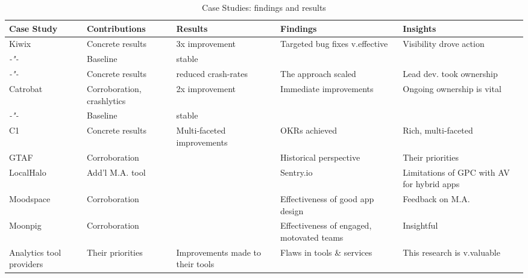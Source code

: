 \begin{landscape} %
\begin{table}
    \centering
    \tabcolsep=0.06cm
    \tiny
    \begin{tabular}{lllll}\toprule
    Case Study                  &Contributions    &Results               &Findings             &Insights  \\
    \midrule
    Kiwix                       &Concrete results &3x improvement        &Targeted bug fixes v.effective &Visibility drove action \\ 
     \textit{-"-}               &Baseline         &stable                &                     & \\
     \textit{-"-}               &Concrete results &reduced crash-rates   &The approach scaled  &Lead dev. took ownership \\
     \midrule
    Catrobat                    &Corroboration, crashlytics &2x improvement     &Immediate improvements &Ongoing ownership is vital \\
     \textit{-"-}               &Baseline         &stable                &                     & \\
     \midrule
    C1                          &Concrete results &Multi-faceted improvements &OKRs achieved & Rich, multi-faceted \\
    GTAF                        &Corroboration    &                      &Historical perspective &Their priorities  \\
    LocalHalo                   &Add'l M.A. tool  &                      &Sentry.io &Limitations of GPC with AV for hybrid apps \\
    Moodspace                   &Corroboration    &                      &Effectiveness of good app design &Feedback on M.A. \\
    Moonpig                     &Corroboration    &                      &Effectiveness of engaged, motovated teams &Insightful \\
    Analytics tool providers    &Their priorities &Improvements made to their tools & Flaws in tools \& services &This research is v.valuable \\
    \bottomrule
    \end{tabular}
    \caption{Case Studies: findings and results}
    \label{tab:empirical-studies-findings-and-results}
\end{table}
\end{landscape}



